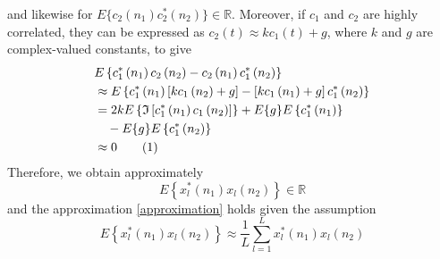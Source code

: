 \documentclass[review]{elsarticle}
\theoremstyle{plain}
\theoremstyle{remark}
\theoremstyle{plain}
\theoremstyle{definition}
\theoremstyle{prop}
\theoremstyle{definition}
\theoremstyle{plain}
\theoremstyle{plain}
\newcommand\numberthis{\addtocounter{equation}{1}\tag{\theequation}}
\begin{document}
and likewise for $E\{c_{2}\left(n_1\right)c_{2}^*\left(n_2\right)\}\in\mathbb{R}$. 
Moreover, if $c_{1}$ and $c_{2}$ are highly correlated, they can be expressed as $c_{2}\left(t\right)\approx kc_{1}\left(t\right)+g$, where $k$ and $g$ are complex-valued constants, to give
\begin{align*}
& E\left\{ c_{1}^{*}\left(n_1\right)c_{2}\left(n_2\right)-c_{2}\left(n_1\right)c_{1}^{*}\left(n_2\right)\right\}  \\
&\approx E\left\{ c_{1}^{*}\left(n_1\right)\left[kc_{1}\left(n_2\right)+g\right]-\left[kc_{1}\left(n_1\right)+g\right]c_{1}^{*}\left(n_2\right)\right\} \\
&= 2kE\left\{\mathfrak{I}\left[c_{1}^{*}\left(n_1\right)c_{1}\left(n_2\right)\right]\right\}+E\{g\}E\left\{c_{1}^{*}\left(n_1\right)\right\}\\&\quad-E\{g\}E\left\{c_{1}^{*}\left(n_2\right)\right\}\\&\approx0 \numberthis \label{11}
\end{align*}
Therefore, we obtain approximately
\begin{equation}
E\left\{x^{*}_l\left(n_1\right)x_l\left(n_2\right)\right\}\in\mathbb{R} \label{real}
\end{equation} 
and the approximation \eqref{approximation} holds given the assumption 
\begin{equation*}
E\left\{x^{*}_l\left(n_1\right)x_l\left(n_2\right)\right\}\approx \frac{1}{L} \underset{l=1}{\overset{L}{\sum}}x_{l}^{*}(n_1)x_{l}(n_2)
\end{equation*} 
%
\end{document}
